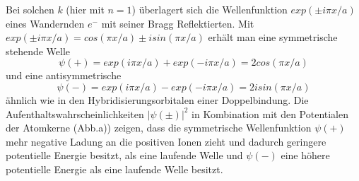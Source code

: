 Bei solchen $k$ (hier mit $n=1$) überlagert sich die Wellenfunktion $exp(\pm i \pi x / a)$ eines Wandernden $e^-$ mit seiner Bragg Reflektierten.
Mit $exp(\pm i \pi x / a) = cos(\pi x/a) \pm i sin(\pi x/a)$ erhält man eine symmetrische stehende Welle
\begin{equation}
    \psi(+) = exp( i \pi x / a) + exp(- i \pi x / a) = 2cos(\pi x/a)
\end{equation}
und eine antisymmetrische
\begin{equation}
    \psi(-) = exp( i \pi x / a) - exp(- i \pi x / a) = 2 i sin(\pi x/a)
\end{equation}
ähnlich wie in den Hybridisierungsorbitalen einer Doppelbindung.
Die Aufenthaltswahrscheinlichkeiten $\left|\psi(\pm)\right|^2$ in Kombination mit den Potentialen der Atomkerne (Abb.a)) zeigen, dass die symmetrische Wellenfunktion $\psi(+)$ mehr negative Ladung an die positiven Ionen zieht und dadurch geringere potentielle Energie besitzt, als eine laufende Welle und $\psi(-)$ eine höhere potentielle Energie als eine laufende Welle besitzt.
